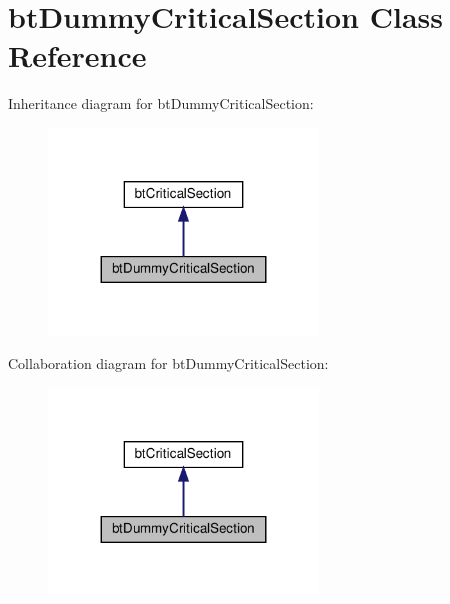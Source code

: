 \hypertarget{classbtDummyCriticalSection}{}\section{bt\+Dummy\+Critical\+Section Class Reference}
\label{classbtDummyCriticalSection}


Inheritance diagram for bt\+Dummy\+Critical\+Section\+:
\nopagebreak
\begin{figure}[H]
\begin{center}
\leavevmode
\includegraphics[width=203pt]{classbtDummyCriticalSection__inherit__graph}
\end{center}
\end{figure}


Collaboration diagram for bt\+Dummy\+Critical\+Section\+:
\nopagebreak
\begin{figure}[H]
\begin{center}
\leavevmode
\includegraphics[width=203pt]{classbtDummyCriticalSection__coll__graph}
\end{center}
\end{figure}
